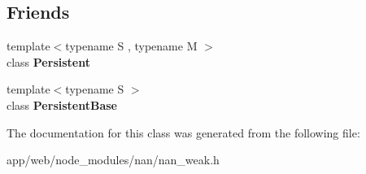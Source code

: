 \subsection*{Friends}
\begin{DoxyCompactItemize}
\item 
\mbox{\label{class_weak_callback_info_ad845ec8872174be0a9ca9a3dd1898d30}} 
{\footnotesize template$<$typename S , typename M $>$ }\\class {\bfseries Persistent}
\item 
\mbox{\label{class_weak_callback_info_abb172e0bb22fc5fed7a3a66f29d046ce}} 
{\footnotesize template$<$typename S $>$ }\\class {\bfseries Persistent\+Base}
\end{DoxyCompactItemize}


The documentation for this class was generated from the following file\+:\begin{DoxyCompactItemize}
\item 
app/web/node\+\_\+modules/nan/nan\+\_\+weak.\+h\end{DoxyCompactItemize}
